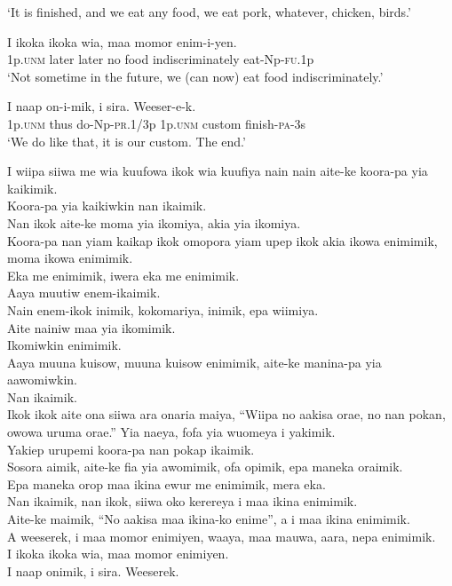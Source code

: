 \glt ‘It is finished, and we eat any food, we eat pork, whatever, chicken, birds.’ \\
\z


\ea\label{ex:a:x20}
\gll  I  ikoka  ikoka  wia,  maa  momor  enim-i-yen. \\
1p.\textsc{unm}  later  later  no  food  indiscriminately  eat-Np-\textsc{fu}.1p \\
\glt ‘Not sometime in the future, we (can now) eat food indiscriminately.’ \\
\z


\ea\label{ex:a:x21}
\gll  I  naap  on-i-mik,  i  sira.  Weeser-e-k. \\
1p.\textsc{unm}  thus  do-Np-\textsc{pr}.1/3p  1p.\textsc{unm}  custom  finish-\textsc{pa}-3s \\
\glt ‘We do like that, it is our custom. The end.’ \\
\z


I wiipa siiwa me wia kuufowa ikok wia kuufiya nain nain aite-ke koora-pa yia kaikimik. \\
Koora-pa yia kaikiwkin  nan ikaimik. \\
Nan ikok aite-ke moma yia ikomiya, akia yia ikomiya. \\
Koora-pa nan yiam kaikap ikok omopora yiam upep ikok  akia ikowa enimimik,  moma ikowa enimimik. \\
Eka me enimimik, iwera eka me enimimik. \\
Aaya muutiw enem-ikaimik. \\
Nain enem-ikok inimik, kokomariya, inimik, epa wiimiya. \\
Aite nainiw maa yia ikomimik. \\
Ikomiwkin enimimik. \\
Aaya muuna kuisow, muuna kuisow enimimik, aite-ke manina-pa yia aawomiwkin. \\
Nan ikaimik. \\
\textrm{Ikok ikok aite ona siiwa ara onaria maiya, “Wiipa no aakisa orae, no nan pokan, owowa uruma orae.”}
Yia naeya, fofa yia wuomeya i yakimik. \\
Yakiep urupemi koora-pa nan pokap ikaimik. \\
Sosora aimik, aite-ke fia yia awomimik, ofa opimik, epa maneka oraimik. \\
Epa maneka orop maa ikina ewur me enimimik, mera eka. \\
Nan ikaimik, nan ikok, siiwa oko kerereya i maa ikina enimimik. \\
Aite-ke maimik, “No aakisa maa ikina-ko enime”, a i maa ikina enimimik. \\
A weeserek, i maa momor enimiyen, waaya, maa mauwa, aara, nepa enimimik. \\
I ikoka ikoka wia, maa momor enimiyen. \\
I naap onimik, i sira. Weeserek. \\
